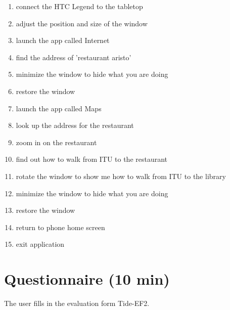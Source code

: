 \documentclass[11pt]{amsart}
\begin{document}
\begin{enumerate}
\item connect the HTC Legend to the tabletop
\item adjust the position and size of the window
\item launch the app called Internet
\item find the address of 'restaurant aristo'
\item minimize the window to hide what you are doing
\item restore the window
\item launch the app called Maps
\item look up the address for the restaurant
\item zoom in on the restaurant
\item find out how to walk from ITU to the restaurant
\item rotate the window to show me how to walk from ITU to the library
\item minimize the window to hide what you are doing
\item restore the window
\item return to phone home screen
\item exit application
\end{enumerate}

\section{Questionnaire (10 min)}

The user fills in the evaluation form Tide-EF2.

%
%
%
%
%
%
%
%
%
\end{document}
